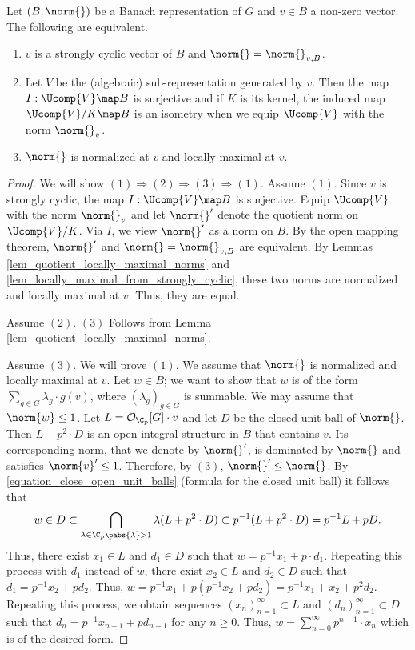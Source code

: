 \begin{thm}\label{thm_strongly_cyclic_spaces}
Let $(B,\norm{})$ be a Banach representation of $G$ and $v\in B$ a non-zero vector.
The following are equivalent.
    \begin{enumerate}
    \item $v$ is a strongly cyclic vector of $B$ and $\norm{}=\norm{}_{v,B}$.
    \item Let $V$ be the (algebraic) sub-representation generated by $v$.
    Then the map $I:\Ucomp{V}\map B$ is surjective and if $K$ is its kernel, the induced map $\Ucomp{V}/K\map B$ is an isometry when we equip $\Ucomp{V}$ with the norm $\norm{}_v$.
    \item $\norm{}$ is normalized at $v$ and locally maximal at $v$.
    \end{enumerate}
\end{thm} 
    \begin{proof}
    We will show $(1)\Rightarrow (2)\Rightarrow (3)\Rightarrow (1)$.
    Assume $(1)$. 
    Since $v$ is strongly cyclic, the map $I:\Ucomp{V}\map B$ is surjective. 
    Equip $\Ucomp{V}$ with the norm $\norm{}_v$ and let $\norm{}'$ denote the quotient norm on $\Ucomp{V}/K$.
    Via $I$, we view $\norm{}'$ as a norm on $B$.
    By the open mapping theorem, $\norm{}'$ and $\norm{}=\norm{}_{v,B}$ are equivalent.
    By Lemmas \ref{lem_quotient_locally_maximal_norms} and \ref{lem_locally_maximal_from_strongly_cyclic}, these two norms are normalized and locally maximal at $v$.
    Thus, they are equal.
    
    Assume $(2)$.
    $(3)$ Follows from Lemma \ref{lem_quotient_locally_maximal_norms}.
    
    Assume $(3)$.
    We will prove $(1)$.
    We assume that $\norm{}$ is normalized and locally maximal at $v$.
    Let $w\in B$; we want to show that $w$ is of the form $\sum_{g\in G}\lambda_g\cdot g(v)$, where $(\lambda_g)_{g\in G}$ is summable.
    We may assume that $\norm{w}\leq 1$.
    Let $L=\mathcal{O}_{\C_p}[G]\cdot v$ and let $D$ be the closed unit ball of $\norm{}$.
    Then $L+p^2\cdot D$ is an open integral structure in $B$ that contains $v$.
    Its corresponding norm, that we denote by $\norm{}'$, is dominated by $\norm{}$ and satisfies $\norm{v}'\leq 1$.
    Therefore, by $(3)$, $\norm{}'\leq \norm{}$.
    By \ref{equation_close_open_unit_balls} (formula for the closed unit ball) it follows that 
    \[w\in D\subset\bigcap_{\substack{\lambda\in\C_p}{\pabs{\lambda}>1}}\lambda(L+p^2\cdot D)\subset p^{-1}(L+p^2\cdot D)=p^{-1}L+pD.\]
    Thus, there exist $x_1\in L$ and $d_1\in D$ such that $w=p^{-1}x_1+p\cdot d_1$.
    Repeating this process with $d_1$ instead of $w$, there exist $x_2\in L$ and $d_2\in D$ such that $d_1=p^{-1}x_2+pd_2$.
    Thus, $w=p^{-1}x_1+p(p^{-1}x_2+pd_2)=p^{-1}x_1+x_2+p^2d_2$.
    Repeating this process, we obtain sequences $(x_n)_{n=1}^\infty\subset L$ and $(d_n)_{n=1}^\infty \subset D$ such that $d_n=p^{-1}x_{n+1}+pd_{n+1}$ for any $n\geq 0$.
    Thus, $w=\sum_{n=0}^\infty p^{n-1}\cdot x_n$ which is of the desired form.    
    \end{proof} 

